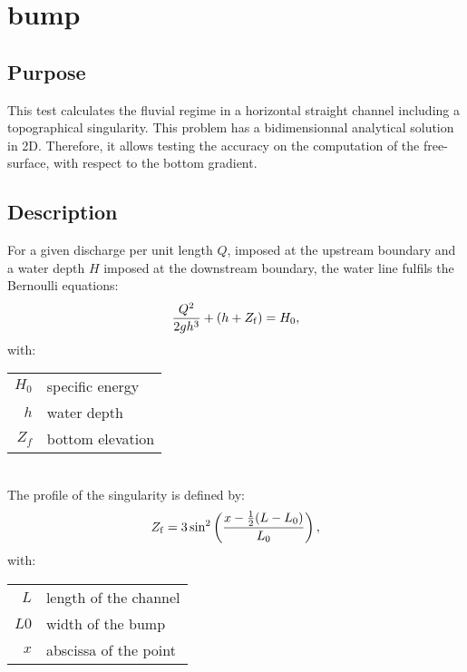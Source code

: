 \chapter{bump}
%
%
\section{Purpose}
%
This test calculates the fluvial regime in a horizontal straight channel
including a topographical singularity.
This problem has a bidimensionnal analytical solution in 2D.
Therefore, it allows testing the accuracy on the computation of the
free-surface, with respect to the bottom gradient.
%
\section{Description}
%
For a given discharge per unit length $Q$, imposed at the upstream
boundary and a water depth $H$ imposed at the downstream boundary,
the water line fulfils the Bernoulli equations:
\begin{equation}
\frac{Q^2}{2gh^3}+ (h + Z_{\rm{f}}) = H_0,
\end{equation}
with:\\
\begin{tabular}{rl}
$H_0$ & specific energy\\
$h$   & water depth\\
$Z_f$ & bottom elevation
\end{tabular}\\

The profile of the singularity is defined by:
\begin{equation}
Z_{\rm{f}} = 3 \sin^2 \left( \frac{x - \frac{1}{2} (L - L_0)}{L_0} \right),
\end{equation}
with:\\
\begin{tabular}{rl}
$L$  & length of the channel\\
$L0$ & width of the bump\\
$x$  & abscissa of the point
\end{tabular}
%
%
%
%
